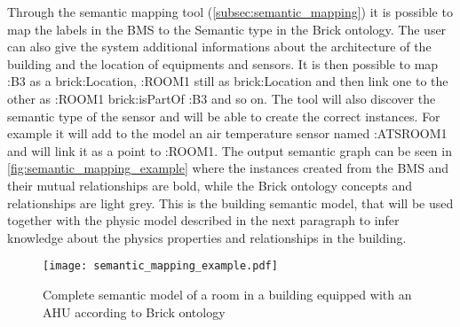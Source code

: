 Through the semantic mapping tool (\autoref{subsec:semantic_mapping}) it is possible to map the labels in the BMS to the Semantic type in the Brick ontology. The user can also give the system additional informations about the architecture of the building and the location of equipments and sensors. It is then possible to map :B3 as a brick:Location, :ROOM1 still as brick:Location and then link one to the other as :ROOM1 brick:isPartOf :B3 and so on. The tool will also discover the semantic type of the sensor and will be able to create the correct instances. For example it will add to the model an air temperature sensor named :ATSROOM1 and will link it as a point to :ROOM1. The output semantic graph can be seen in \autoref{fig:semantic_mapping_example} where the instances created from the BMS and their mutual relationships are bold, while the Brick ontology concepts and relationships are light grey. This is the building semantic model, that will be used together with the physic model described in the next paragraph to infer knowledge about the physics properties and relationships in the building.
\begin{figure}
  \texttt{[image: semantic\_mapping\_example.pdf]}
  \caption{Complete semantic model of a room in a building equipped with an AHU according to Brick ontology}
  \label{fig:semantic_mapping_example}
\end{figure}

